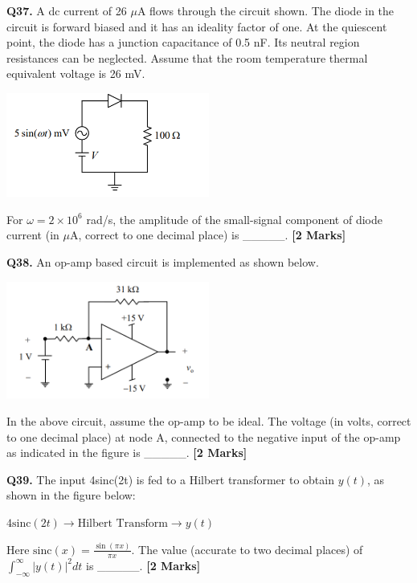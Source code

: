 \documentclass[11pt]{article}
\newcommand{\questionb}[2]{
    \noindent\textbf{Q#2.} #1 \hfill \textbf{[2 Marks]}
}
\begin{document}
\vspace{0.5cm}

\questionb{A dc current of 26 $\mu$A flows through the circuit shown. The diode in the circuit is forward biased and it has an ideality factor of one. At the quiescent point, the diode has a junction capacitance of 0.5 nF. Its neutral region resistances can be neglected. Assume that the room temperature thermal equivalent voltage is 26 mV.

\begin{center}
\includegraphics[width=0.5\textwidth]{figures/37.png}
\end{center}

For $\omega = 2 \times 10^6$ rad/s, the amplitude of the small-signal component of diode current (in $\mu$A, correct to one decimal place) is \_\_\_\_\_.}{37}

\vspace{0.5cm}

\questionb{An op-amp based circuit is implemented as shown below.

\begin{center}
\includegraphics[width=0.5\textwidth]{figures/38.png}
\end{center}

In the above circuit, assume the op-amp to be ideal. The voltage (in volts, correct to one decimal place) at node A, connected to the negative input of the op-amp as indicated in the figure is \_\_\_\_\_.}{38}

\vspace{0.5cm}

\questionb{The input 4sinc(2t) is fed to a Hilbert transformer to obtain $y(t)$, as shown in the figure below:

\begin{center}
$4\text{sinc}(2t) \rightarrow \boxed{\text{Hilbert Transform}} \rightarrow y(t)$
\end{center}

Here $\text{sinc}(x) = \frac{\sin(\pi x)}{\pi x}$. The value (accurate to two decimal places) of $\int_{-\infty}^{\infty} |y(t)|^2 dt$ is \_\_\_\_\_.}{39}
\end{document}
